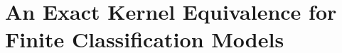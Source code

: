 \chapter{An Exact Kernel Equivalence for Finite Classification Models} %
\label{Chapter4} %













